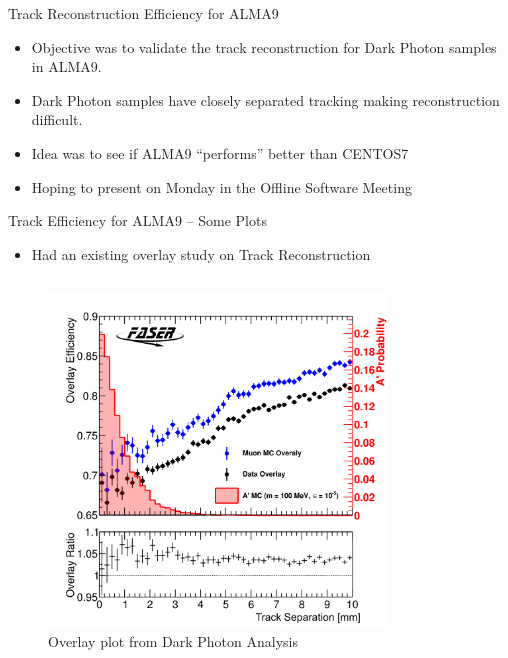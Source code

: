 \begin{frame}{Track Reconstruction Efficiency for ALMA9}
    \begin{itemize}
        \item Objective was to validate the track reconstruction for Dark Photon samples in ALMA9.
        \item Dark Photon samples have closely separated tracking making reconstruction difficult.
        \item Idea was to see if ALMA9 ``performs'' better than CENTOS7 
        \item Hoping to present on Monday in the Offline Software Meeting
    \end{itemize}
\end{frame}

\begin{frame}{Track Efficiency for ALMA9  -- Some Plots}
    \begin{itemize}
        \item Had an existing overlay study on Track Reconstruction 
    \end{itemize}
    \vspace{-0.5cm}
    \begin{columns}
        \begin{column}{0.5 \textwidth}
            \begin{figure}
                \centering
                \includegraphics[width=0.8\textwidth]{assets/OverlayTracks.png}
                \caption{Overlay plot from Dark Photon Analysis}
            \end{figure}

\end{column}
\end{columns}
\end{frame}
